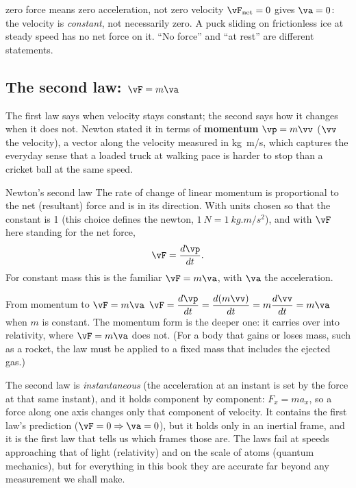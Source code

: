\begin{trapbox}{zero force means zero acceleration, not zero velocity}
$\vF_{\text{net}}=0$ gives $\va=0$: the velocity is \emph{constant}, not necessarily zero. A puck
sliding on frictionless ice at steady speed has no net force on it. ``No force'' and ``at rest'' are
different statements.
\end{trapbox}

\subsection{\texorpdfstring{The second law: $\vF=m\va$}{The second law: F = ma}}

The first law says when velocity stays constant; the second says how it changes when it does not. Newton stated it in terms of \textbf{momentum} $\vp=m\vv$ ($\vv$ the velocity), a vector along
the velocity measured in \si{kg.m/s}, which captures the everyday sense that a loaded truck at walking
pace is harder to stop than a cricket ball at the same speed.

\begin{keybox}{Newton's second law}
The rate of change of linear momentum is proportional to the net (resultant) force and is in its
direction. With units chosen so that the constant is 1 (this choice defines the newton,
$\SI{1}{N}=\SI{1}{kg.m/s^2}$), and with $\vF$ here standing for the net force,
\[
\vF=\frac{d\vp}{dt}.
\]
For constant mass this is the familiar $\vF=m\va$, with $\va$ the acceleration.
\end{keybox}

\begin{derivbox}{From momentum to $\vF=m\va$}
$\vF=\dfrac{d\vp}{dt}=\dfrac{d(m\vv)}{dt}=m\dfrac{d\vv}{dt}=m\va$ when $m$ is constant. The momentum form
is the deeper one: it carries over into relativity, where $\vF=m\va$ does not. (For a body that gains
or loses mass, such as a rocket, the law must be applied to a fixed mass that includes the ejected gas.)
\end{derivbox}

The second law is \emph{instantaneous} (the acceleration at an instant is set by the force at that same
instant), and it holds component by component: $F_x=ma_x$, so a force along one axis changes only that
component of velocity. It contains the first law's prediction ($\vF=0\Rightarrow\va=0$), but it holds
only in an inertial frame, and it is the first law that tells us which frames those are. The laws fail at
speeds approaching that of light (relativity) and on the scale of atoms (quantum mechanics), but for
everything in this book they are accurate far beyond any measurement we shall make.

